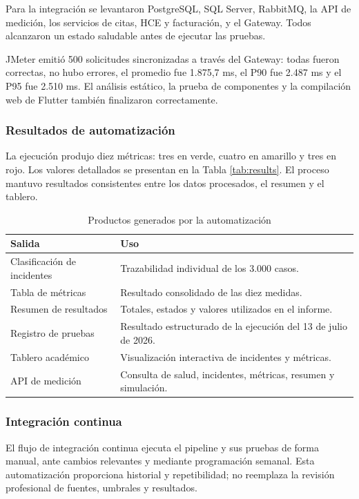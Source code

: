 Para la integración se levantaron PostgreSQL, SQL Server, RabbitMQ, la API de medición, los servicios de citas, HCE y facturación, y el Gateway. Todos alcanzaron un estado saludable antes de ejecutar las pruebas.

JMeter emitió 500 solicitudes sincronizadas a través del Gateway: todas fueron correctas, no hubo errores, el promedio fue 1.875,7 ms, el P90 fue 2.487 ms y el P95 fue 2.510 ms. El análisis estático, la prueba de componentes y la compilación web de Flutter también finalizaron correctamente.

\subsubsection{Resultados de automatización}

La ejecución produjo diez métricas: tres en verde, cuatro en amarillo y tres en rojo. Los valores detallados se presentan en la Tabla \ref{tab:results}. El proceso mantuvo resultados consistentes entre los datos procesados, el resumen y el tablero.

\begin{table}[H]
\centering
\caption{Productos generados por la automatización}
\label{tab:pipeline-outputs}
\begin{tabularx}{\textwidth}{p{5.1cm}Y}
\toprule
Salida & Uso \\
\midrule
Clasificación de incidentes & Trazabilidad individual de los 3.000 casos. \\
Tabla de métricas & Resultado consolidado de las diez medidas. \\
Resumen de resultados & Totales, estados y valores utilizados en el informe. \\
Registro de pruebas & Resultado estructurado de la ejecución del 13 de julio de 2026. \\
Tablero académico & Visualización interactiva de incidentes y métricas. \\
API de medición & Consulta de salud, incidentes, métricas, resumen y simulación. \\
\bottomrule
\end{tabularx}
\end{table}

\subsubsection{Integración continua}

El flujo de integración continua ejecuta el pipeline y sus pruebas de forma manual, ante cambios relevantes y mediante programación semanal. Esta automatización proporciona historial y repetibilidad; no reemplaza la revisión profesional de fuentes, umbrales y resultados.


